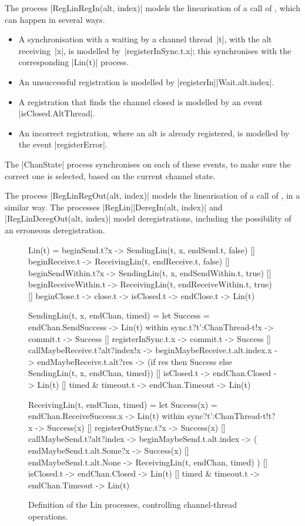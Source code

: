 The process |RegLinRegIn(alt, index)| models the linearisation of a call of
, which can happen in several ways.
%
\begin{itemize}
\item A synchronisation with a waiting  by a channel thread~|t|,
  with the alt receiving~|x|, is modelled by~|registerInSync.t.x|;
  this synchronises with the corresponding |Lin(t)| process.

\item An unsuccessful registration is modelled by
  |registerIn|\-|Wait.alt.index|.

\item A registration that finds the channel closed is modelled by an event
  |isClosed.AltThread|.

\item An incorrect registration, where an alt is already registered, is
  modelled by the event |registerError|.
\end{itemize}
% 
The |ChanState| process synchronises on each of these events, to make sure the
correct one is selected, based on the current channel state. 

The process |RegLinRegOut(alt, index)| models the linearisation of a call of
, in a similar way.  The processes
|RegLin|\-|DeregIn(alt, index)| and |RegLinDeregOut(alt, index)| model
deregistrations, including the possibility of an erroneous deregistration.


\begin{figure}
\begin{cspm}
Lin(t) = 
  beginSend.t?x -> SendingLin(t, x, endSend.t, false)
  [] beginReceive.t -> ReceivingLin(t, endReceive.t, false)
  [] beginSendWithin.t?x -> SendingLin(t, x, endSendWithin.t, true)
  [] beginReceiveWithin.t -> ReceivingLin(t, endReceiveWithin.t, true) 
  [] beginClose.t -> close.t -> isClosed.t -> endClose.t -> Lin(t)
  
SendingLin(t, x, endChan, timed) = 
  let Success = endChan.SendSuccess -> Lin(t) within
  sync.t?t':ChanThread-{t}!x -> commit.t -> Success
  [] registerInSync.t.x -> commit.t -> Success
  [] callMaybeReceive.t?alt?index!x -> beginMaybeReceive.t.alt.index.x -> endMaybeReceive.t.alt?res -> 
       (if res then Success else SendingLin(t, x, endChan, timed))
  [] isClosed.t -> endChan.Closed -> Lin(t)
  [] timed & timeout.t -> endChan.Timeout -> Lin(t)
  
ReceivingLin(t, endChan, timed) =  
  let Success(x) = endChan.ReceiveSuccess.x -> Lin(t) within
  sync?t':ChanThread-{t}!t?x -> Success(x) 
  [] registerOutSync.t?x -> Success(x) 
  [] callMaybeSend.t?alt?index -> beginMaybeSend.t.alt.index -> (
       endMaybeSend.t.alt.Some?x -> Success(x) 
       [] endMaybeSend.t.alt.None -> ReceivingLin(t, endChan, timed) )
  [] isClosed.t -> endChan.Closed -> Lin(t)
  [] timed & timeout.t -> endChan.Timeout -> Lin(t)
\end{cspm}
\caption{Definition of the {\scalashape Lin} processes, controlling
  channel-thread operations.  \label{fig:Lin}}
\end{figure}

